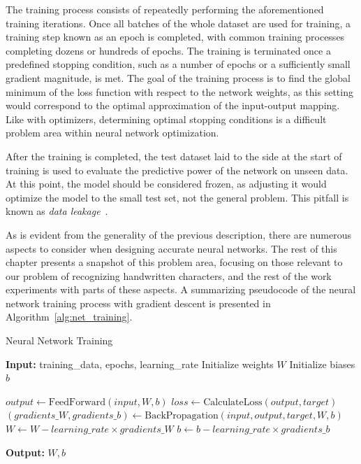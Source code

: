 \documentclass[english,twoside,openright]{UH_DS_MSc}
\begin{document}
The training process consists of repeatedly performing the aforementioned training 
iterations. Once all batches of the whole dataset are used for training,
a training step known as an epoch is completed, with common training processes 
completing dozens or hundreds of epochs. The training is terminated once a predefined 
stopping condition, such as a number of epochs or a sufficiently small gradient 
magnitude, is met. The goal of the training process is to find the global minimum of the loss 
function with respect to the network weights, as this setting would correspond to 
the optimal approximation of the input-output mapping. Like with optimizers, 
determining optimal stopping conditions is a difficult problem area within neural network optimization.

After the training is completed, the test dataset laid to the side at the start of 
training is used to evaluate the predictive power of the network on unseen data.
At this point, the model should be considered frozen, as adjusting it would 
optimize the model to the small test set, not the general problem. This pitfall is 
known as \textit{data leakage}~\cite{engbook}.

As is evident from the generality of the previous description, there are numerous 
aspects to consider when designing accurate neural networks. The 
rest of this chapter presents a snapshot of this problem area, focusing on those 
relevant to our problem of recognizing handwritten characters, and the rest of the 
work experiments with parts of these aspects. A summarizing pseudocode of the 
neural network training process with gradient descent is presented in Algorithm~\ref{alg:net_training}.

\begin{algorithm}
    \caption{Neural Network Training}
    \begin{algorithmic}[1]
        \State \textbf{Input:} training\_data, epochs, learning\_rate
        \State Initialize weights $W$
        \State Initialize biases $b$
        
                \State $output \gets \text{FeedForward}(input, W, b)$
                \State $loss \gets \text{CalculateLoss}(output, target)$
                \State $(gradients\_W, gradients\_b) \gets \text{BackPropagation}(input, output, target, W, b)$
                \State $W \gets W - learning\_rate \times gradients\_W$
                \State $b \gets b - learning\_rate \times gradients\_b$
            \EndFor
        \EndFor
        
        \State \textbf{Output:} $W, b$  
    \end{algorithmic}
    \label{alg:net_training}
\end{algorithm}
\end{document}
